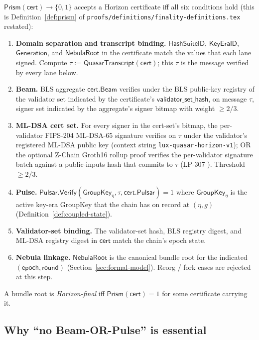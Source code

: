 \begin{definition}[Prism]
\label{def:prism-quasar-horizon}
$\mathsf{Prism}(\mathsf{cert}) \to \{0, 1\}$ accepts a Horizon certificate iff all six conditions hold (this is Definition~\ref{def:prism} of \texttt{proofs/definitions/finality-definitions.tex} restated):
\begin{enumerate}[leftmargin=2em,nosep]
  \item \textbf{Domain separation and transcript binding.} $\mathsf{HashSuiteID}$, $\mathsf{KeyEraID}$, $\mathsf{Generation}$, and $\mathsf{NebulaRoot}$ in the certificate match the values that each lane signed. Compute $\tau := \mathsf{QuasarTranscript}(\mathsf{cert})$; this $\tau$ is the message verified by every lane below.
  \item \textbf{Beam.} BLS aggregate $\mathsf{cert.Beam}$ verifies under the BLS public-key registry of the validator set indicated by the certificate's $\mathsf{validator\_set\_hash}$, on message $\tau$, signer set indicated by the aggregate's signer bitmap with weight $\geq 2/3$.
  \item \textbf{ML-DSA cert set.} For every signer in the cert-set's bitmap, the per-validator FIPS-204 ML-DSA-65 signature verifies on $\tau$ under the validator's registered ML-DSA public key (context string \texttt{lux-quasar-horizon-v1}); OR the optional Z-Chain Groth16 rollup proof verifies the per-validator signature batch against a public-inputs hash that commits to $\tau$ (LP-307 \cite{lp307}). Threshold $\geq 2/3$.
  \item \textbf{Pulse.} $\mathsf{Pulsar.Verify}(\mathsf{GroupKey}_\eta, \tau, \mathsf{cert.Pulsar}) = 1$ where $\mathsf{GroupKey}_\eta$ is the active key-era GroupKey that the chain has on record at $(\eta, g)$ (Definition~\ref{def:coupled-state}).
  \item \textbf{Validator-set binding.} The validator-set hash, BLS registry digest, and ML-DSA registry digest in $\mathsf{cert}$ match the chain's epoch state.
  \item \textbf{Nebula linkage.} $\mathsf{NebulaRoot}$ is the canonical bundle root for the indicated $(\mathsf{epoch}, \mathsf{round})$ (Section~\ref{sec:formal-model}). Reorg / fork cases are rejected at this step.
\end{enumerate}
A bundle root is \emph{Horizon-final} iff $\mathsf{Prism}(\mathsf{cert}) = 1$ for some certificate carrying it.
\end{definition}

\subsection{Why ``no Beam-OR-Pulse'' is essential}

